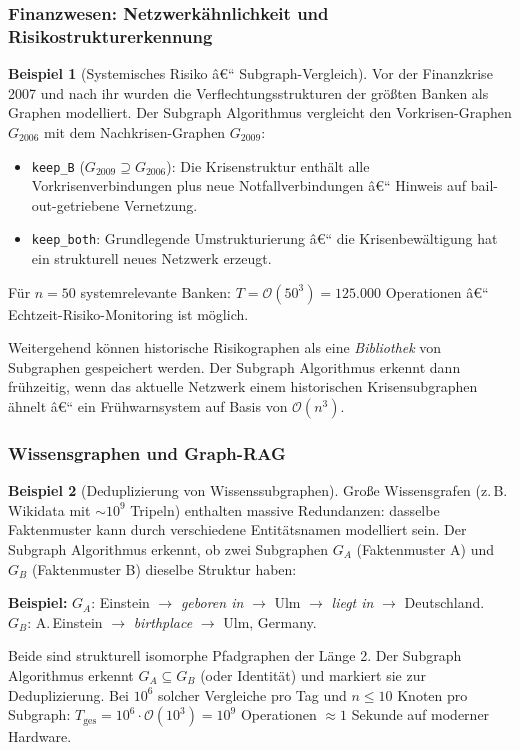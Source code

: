 ﻿\documentclass[12pt,a4paper,twoside]{article}
\theoremstyle{definition}
\newtheorem{beispiel}{Beispiel}[section]
\theoremstyle{plain}
\theoremstyle{remark}
\begin{document}
\subsubsection{Finanzwesen: Netzwerkähnlichkeit und\\
               Risikostrukturerkennung}

\begin{beispiel}[Systemisches Risiko â€“ Subgraph-Vergleich]
Vor der Finanzkrise 2007 und nach ihr wurden die
Verflechtungsstrukturen der größten Banken als
Graphen modelliert.  Der Subgraph Algorithmus vergleicht
den Vorkrisen-Graphen $G_{2006}$ mit dem
Nachkrisen-Graphen $G_{2009}$:
\begin{itemize}
  \item \texttt{keep\_B} ($G_{2009} \supseteq G_{2006}$):
        Die Krisenstruktur enthält alle Vorkrisenverbindungen
        plus neue Notfallverbindungen â€“ Hinweis auf
        bail-out-getriebene Vernetzung.
  \item \texttt{keep\_both}: Grundlegende Umstrukturierung â€“
        die Krisenbewältigung hat ein strukturell neues
        Netzwerk erzeugt.
\end{itemize}
Für $n = 50$ systemrelevante Banken:
$T = \mathcal{O}(50^3) = 125.000$ Operationen â€“
Echtzeit-Risiko-Monitoring ist möglich.

Weitergehend können historische Risikographen als
eine \emph{Bibliothek} von Subgraphen gespeichert werden.
Der Subgraph Algorithmus erkennt dann frühzeitig,
wenn das aktuelle Netzwerk einem historischen
Krisensubgraphen ähnelt â€“ ein
Frühwarnsystem auf Basis von $\mathcal{O}(n^3)$.
\end{beispiel}

\subsubsection{Wissensgraphen und Graph-RAG}

\begin{beispiel}[Deduplizierung von Wissenssubgraphen]
Große Wissensgrafen (z.\,B. Wikidata mit $\sim 10^9$
Tripeln) enthalten massive Redundanzen: dasselbe
Faktenmuster kann durch verschiedene Entitätsnamen
modelliert sein.  Der Subgraph Algorithmus erkennt,
ob zwei Subgraphen $G_A$ (Faktenmuster A) und
$G_B$ (Faktenmuster B) dieselbe Struktur haben:

\textbf{Beispiel:}
$G_A$: Einstein $\to$ \textit{geboren in} $\to$ Ulm
$\to$ \textit{liegt in} $\to$ Deutschland.\\
$G_B$: A.\,Einstein $\to$ \textit{birthplace} $\to$ Ulm, Germany.

Beide sind strukturell isomorphe Pfadgraphen der Länge 2.
Der Subgraph Algorithmus erkennt $G_A \subseteq G_B$
(oder Identität) und markiert sie zur Deduplizierung.
Bei $10^6$ solcher Vergleiche pro Tag und
$n \leq 10$ Knoten pro Subgraph:
$T_{\text{ges}} = 10^6 \cdot \mathcal{O}(10^3) = 10^9$
Operationen $\approx 1$ Sekunde auf moderner Hardware.
\end{beispiel}
\end{document}

